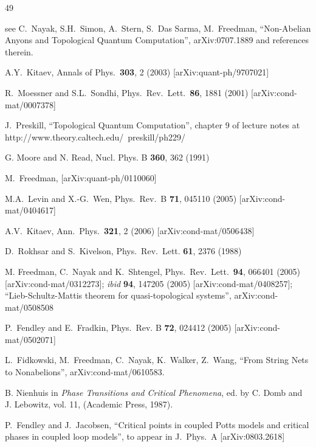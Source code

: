 \documentclass[11pt]{article}
\begin{document}
\begin{thebibliography}{49}

see  C.~Nayak, S.H.~Simon, A.~Stern, S.~Das Sarma, M.~Freedman,
``Non-Abelian Anyons and Topological Quantum Computation'',
arXiv:0707.1889 and references therein.


A.Y.~Kitaev,
Annals of Phys.\, {\bf 303}, 2 (2003)
[arXiv:quant-ph/9707021]

 R.~Moessner and S.L.~Sondhi,
Phys.~Rev.~Lett.\ {\bf 86}, 1881 (2001)
[arXiv:cond-mat/0007378]


 J.~Preskill, ``Topological Quantum
  Computation'', chapter 9 of lecture notes at 
http://www.theory.caltech.edu/~preskill/ph229/ 

G. Moore and N. Read, Nucl. Phys. B {\bf 360},  362  (1991)

M.~Freedman, 
[arXiv:quant-ph/0110060]


M.A.~Levin and X.-G.~Wen,
Phys.\, Rev.\, B {\bf 71}, 045110 (2005)
[arXiv:cond-mat/0404617]

A.V.~Kitaev, Ann.~Phys.\ {\bf 321}, 2 (2006)
[arXiv:cond-mat/0506438]


D.~Rokhsar and S.~Kivelson, Phys.~Rev.~Lett. {\bf 61}, 2376 (1988)


M. Freedman, C.~Nayak and K.~Shtengel,
Phys.\, Rev.\, Lett.\ {\bf 94}, 066401 (2005) [arXiv:cond-mat/0312273];
{\it ibid} {\bf 94}, 147205 (2005) [arXiv:cond-mat/0408257];
``Lieb-Schultz-Mattis theorem for quasi-topological systems'', 
arXiv:cond-mat/0508508

 P.~Fendley and E.~Fradkin, Phys.~Rev. B {\bf 72}, 024412 (2005)
[arXiv:cond-mat/0502071]


L.~Fidkowski, M.~Freedman, C.~Nayak, K.~Walker, Z.~Wang,
``From String Nets to Nonabelions'', arXiv:cond-mat/0610583.

 B. Nienhuis in {\it Phase Transitions and
Critical Phenomena}, ed. by C. Domb and J. Lebowitz, vol. 11,
(Academic Press, 1987).


 P.~Fendley and J.~Jacobsen, ``Critical points in coupled
  Potts models and critical phases in coupled loop models'',
to appear in J.~Phys.~A [arXiv:0803.2618]


\end{thebibliography}
\end{document}
